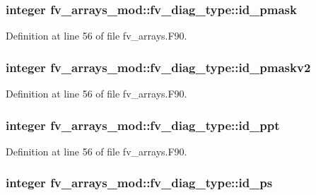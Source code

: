 \subsubsection[{id\-\_\-pmask}]{\setlength{\rightskip}{0pt plus 5cm}integer fv\-\_\-arrays\-\_\-mod\-::fv\-\_\-diag\-\_\-type\-::id\-\_\-pmask}\label{structfv__arrays__mod_1_1fv__diag__type_a8d5e190524ed5c0d1bed425ddefb6d9d}


Definition at line 56 of file fv\-\_\-arrays.\-F90.

\subsubsection[{id\-\_\-pmaskv2}]{\setlength{\rightskip}{0pt plus 5cm}integer fv\-\_\-arrays\-\_\-mod\-::fv\-\_\-diag\-\_\-type\-::id\-\_\-pmaskv2}\label{structfv__arrays__mod_1_1fv__diag__type_a236e3a15391c143a9c6e50ee1f16e9bc}


Definition at line 56 of file fv\-\_\-arrays.\-F90.

\subsubsection[{id\-\_\-ppt}]{\setlength{\rightskip}{0pt plus 5cm}integer fv\-\_\-arrays\-\_\-mod\-::fv\-\_\-diag\-\_\-type\-::id\-\_\-ppt}\label{structfv__arrays__mod_1_1fv__diag__type_ad1895bc2acd1f2640f89320444cdc75a}


Definition at line 56 of file fv\-\_\-arrays.\-F90.

\subsubsection[{id\-\_\-ps}]{\setlength{\rightskip}{0pt plus 5cm}integer fv\-\_\-arrays\-\_\-mod\-::fv\-\_\-diag\-\_\-type\-::id\-\_\-ps}\label{structfv__arrays__mod_1_1fv__diag__type_ad5e5adc5340a72ba40be7cd619389f17}


